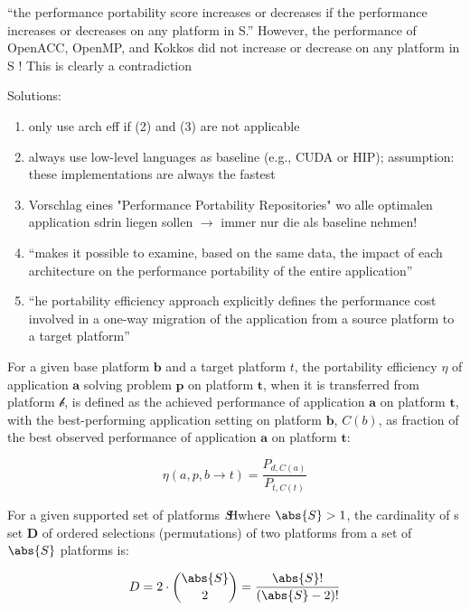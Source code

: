 \begin{quotebox}{\citet{marowka_portability_2024}}
    “the performance portability score increases or decreases if the performance increases or decreases on any platform in S.” However, the performance of OpenACC, OpenMP, and Kokkos did not increase or decrease on any platform in S ! This is clearly a contradiction
\end{quotebox}

Solutions: 
\begin{enumerate}
    \item only use arch eff if (2) and (3) are not applicable
    \item always use low-level languages as baseline (e.g., CUDA or HIP); assumption: these implementations are always the fastest
    \item Vorschlag eines "Performance Portability Repositories" wo alle optimalen application sdrin liegen sollen $\rightarrow$ immer nur die als baseline nehmen!
    \item \enquote{makes it possible to examine, based on the same data, the impact of each architecture on the performance portability of the entire application}
    \item \enquote{he portability efficiency approach explicitly defines the performance cost involved in a one-way migration of the application from a source platform to a target platform}
\end{enumerate}

\begin{definition}\label{def:pp_eff}
For a given base platform $\mathbf{b}$ and a target platform $t$, the portability efficiency $\eta$ of application $\mathbf{a}$ solving problem $\mathbf{p}$ on platform $\mathbf{t}$, when it is transferred from platform $\mathcal{b}$, is defined as the achieved performance of application $\mathbf{a}$ on platform $\mathbf{t}$, with the best-performing application setting on platform $\mathbf{b}$, $C(b)$, as fraction of the best observed performance of application $\mathbf{a}$ on platform $\mathbf{t}$:

\[
    \eta(a, p, b \rightarrow t) = \frac{P_{d, C(a)}}{P_{t, C(t)}}
\]
\end{definition}

\begin{definition}\label{def:pp_eff_cardinality}
For a given supported set of platforms $S \clap H$ where $\abs{S} > 1$, the cardinality of s set $\mathbf{D}$ of ordered selections (permutations) of two platforms from a set of $\abs{S}$ platforms is: 

\[
    D = 2 \cdot \binom{\abs{S}}{2} = \frac{\abs{S}!}{(\abs{S} - 2)!}
\]
\end{definition}

